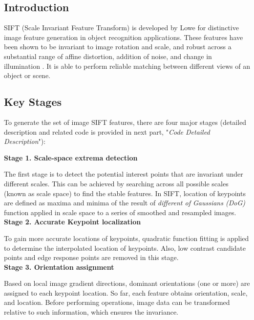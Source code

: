 \documentclass[paper=a4, fontsize=11pt]{scrartcl} %
\numberwithin{equation}{section} %
\numberwithin{figure}{section} %
\numberwithin{table}{section} %
\begin{document}
\subsection{Introduction}

SIFT (Scale Invariant Feature Transform) is developed by Lowe \cite{sift} \cite{sift-99} for distinctive image feature generation in object recognition applications. These features have been shown to be invariant to image rotation and scale, and robust across a substantial range of affine distortion, addition of noise, and change in illumination \cite{Se01vision-basedmobile}. It is able to perform reliable matching between different views of an object or scene.


\subsection{Key Stages}

To generate the set of image SIFT features, there are four major stages (detailed description and related code is provided in next part, "\textsl{Code Detailed Description}"):

\textbf{Stage 1. Scale-space extrema detection}

The first stage is to detect the potential interest points that are invariant under different scales. This can be achieved by searching across all possible scales (known as scale space) to find the stable features. In SIFT, location of keypoints are defined as maxima and minima of the result of \textsl{different of Gaussians (DoG)} function applied in scale space to a series of smoothed and resampled images.\\

\textbf{Stage 2. Accurate Keypoint localization}

To gain more accurate locations of keypoints, quadratic function fitting is applied to determine the interpolated location of keypoints. Also, low contrast candidate points and edge response points are removed in this stage.\\

\textbf{Stage 3. Orientation assignment}

Based on local image gradient directions, dominant orientations (one or more) are assigned to each keypoint location. So far, each feature obtains orientation, scale, and location. Before performing operations, image data can be transformed relative to such information, which ensures the invariance.\\
\end{document}
